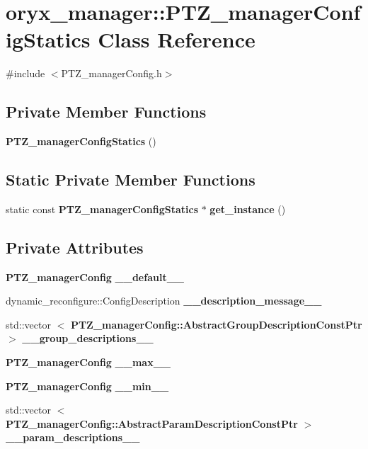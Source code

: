 \section{oryx\-\_\-manager\-:\-:\-P\-T\-Z\-\_\-manager\-Config\-Statics \-Class \-Reference}
\label{classoryx__manager_1_1PTZ__managerConfigStatics}


{\ttfamily \#include $<$\-P\-T\-Z\-\_\-manager\-Config.\-h$>$}

\subsection*{\-Private \-Member \-Functions}
\begin{DoxyCompactItemize}
\item 
{\bf \-P\-T\-Z\-\_\-manager\-Config\-Statics} ()
\end{DoxyCompactItemize}
\subsection*{\-Static \-Private \-Member \-Functions}
\begin{DoxyCompactItemize}
\item 
static const \*
{\bf \-P\-T\-Z\-\_\-manager\-Config\-Statics} $\ast$ {\bf get\-\_\-instance} ()
\end{DoxyCompactItemize}
\subsection*{\-Private \-Attributes}
\begin{DoxyCompactItemize}
\item 
{\bf \-P\-T\-Z\-\_\-manager\-Config} {\bf \-\_\-\-\_\-default\-\_\-\-\_\-}
\item 
dynamic\-\_\-reconfigure\-::\-Config\-Description {\bf \-\_\-\-\_\-description\-\_\-message\-\_\-\-\_\-}
\item 
std\-::vector\*
$<$ {\bf \-P\-T\-Z\-\_\-manager\-Config\-::\-Abstract\-Group\-Description\-Const\-Ptr} $>$ {\bf \-\_\-\-\_\-group\-\_\-descriptions\-\_\-\-\_\-}
\item 
{\bf \-P\-T\-Z\-\_\-manager\-Config} {\bf \-\_\-\-\_\-max\-\_\-\-\_\-}
\item 
{\bf \-P\-T\-Z\-\_\-manager\-Config} {\bf \-\_\-\-\_\-min\-\_\-\-\_\-}
\item 
std\-::vector\*
$<$ {\bf \-P\-T\-Z\-\_\-manager\-Config\-::\-Abstract\-Param\-Description\-Const\-Ptr} $>$ {\bf \-\_\-\-\_\-param\-\_\-descriptions\-\_\-\-\_\-}
\end{DoxyCompactItemize}
